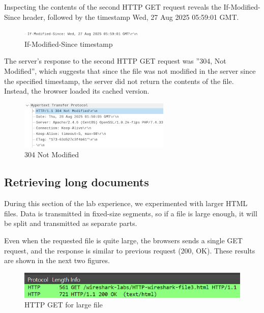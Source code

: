 Inspecting the contents of the second HTTP GET request reveals the
If-Modified-Since header, followed by the timestamp Wed, 27 Aug 2025 05:59:01
GMT.\@

\begin{figure}[htbp]
    \centering
    \includegraphics[width=1\linewidth]{img/9.png}
    \caption{If-Modified-Since timestamp}\label{fig:9}
\end{figure}

The server's response to the second HTTP GET request was ''304, Not Modified'',
which suggests that since the file was not modified in the server since the
specified timestamp, the server did not return the contents of the file.
Instead, the browser loaded its cached version.

\begin{figure}[htbp]
    \centering
    \includegraphics[width=1\linewidth]{img/10.png}
    \caption{304 Not Modified}\label{fig:10}
\end{figure}

\subsection{Retrieving long documents}
During this section of the lab experience, we experimented with larger HTML
files. Data is transmitted in fixed-size segments, so if a file is large
enough, it will be split and transmitted as separate parts.

Even when the requested file is quite large, the browsers sends a single GET
request, and the response is similar to previous request (200, OK). These
results are shown in the next two figures.

\begin{figure}[htbp]
    \centering
    \includegraphics[width=1\linewidth]{img/11.png}
    \caption{HTTP GET for large file}\label{fig:11}
\end{figure}

